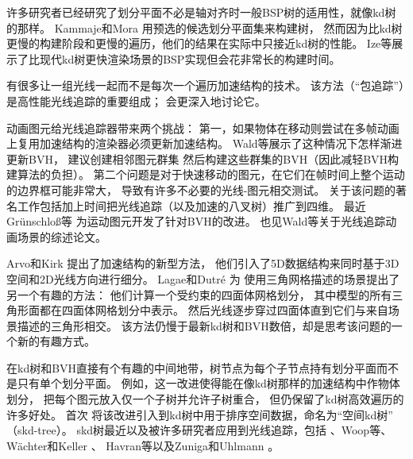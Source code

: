 许多研究者已经研究了划分平面不必是轴对齐时一般BSP树的适用性，就像kd树的那样。
Kammaje和Mora \parencite*{4342591}用预选的候选划分平面集来构建树，
然而因为比kd树更慢的构建阶段和更慢的遍历，他们的结果在实际中只接近kd树的性能。
Ize等\parencite*{4634637}展示了比现代kd树更快渲染场景的BSP实现但会花非常长的构建时间。

有很多让一组光线一起而不是每次一个遍历加速结构的技术。
该方法（“包追踪”）是高性能光线追踪的重要组成；
会更深入地讨论它。

动画图元给光线追踪器带来两个挑战：
第一，如果物体在移动则尝试在多帧动画上复用加速结构的渲染器必须更新加速结构。
Wald等\parencite*{10.2312:egst.20071056}展示了这种情况下怎样渐进更新BVH，
\citet{10.1111/j.1467-8659.2009.01497.x}建议创建相邻图元群集
然后构建这些群集的BVH（因此减轻BVH构建算法的负担）。
第二个问题是对于快速移动的图元，在它们在帧时间上整个运动的边界框可能非常大，
导致有许多不必要的光线-图元相交测试。
关于该问题的著名工作包括\citet{504}加上时间把光线追踪（以及加速的八叉树）推广到四维。
最近Gr\"{u}nschlo\ss{}等\parencite*{10.1145/2018323.2018334}
为运动图元开发了针对BVH的改进。
也见Wald等\parencite*{10.2312:egst.20071056}关于光线追踪动画场景的综述论文。

Arvo和Kirk \parencite*{10.1145/37401.37409}提出了加速结构的新型方法，
他们引入了5D数据结构来同时基于3D空间和2D光线方向进行细分。
Lagae和Dutré \parencite*{10.1111/j.1467-8659.2008.01269.x}为
使用三角网格描述的场景提出了另一个有趣的方法：
他们计算一个受约束的四面体网格划分，
其中模型的所有三角形面都在四面体网格划分中表示。
然后光线逐步穿过四面体直到它们与来自场景描述的三角形相交。
该方法仍慢于最新kd树和BVH数倍，却是思考该问题的一个新的有趣方式。

在kd树和BVH直接有个有趣的中间地带，树节点为每个子节点持有划分平面而不是只有单个划分平面。
例如，这一改进使得能在像kd树那样的加速结构中作物体划分，
把每个图元放入仅一个子树并允许子树重合，
但仍保留了kd树高效遍历的许多好处。
\citet{10.1007/978-3-642-72617-0_17}首次
将该改进引入到kd树中用于排序空间数据，命名为“空间kd树”
（skd-tree）。
skd树最近以及被许多研究者应用到光线追踪，包括
\citet{10.1145/585740.585761}、Woop等\parencite*{10.1145/1283900.1283912}、
W\"{a}chter和Keller \parencite*{10.5555/2383894.2383912}、
Havran等\parencite*{4061548}以及Zuniga和Uhlmann \parencite*{2151237X.2006.10129224}。

